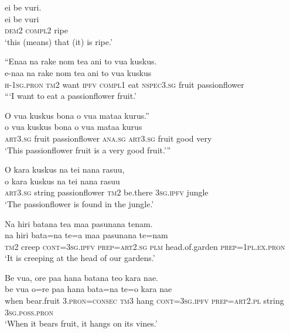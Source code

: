 \ea\label{ex:text7-36}
ei be vuri.\\
\gll ei	be	vuri\\
     \textsc{dem}2	\textsc{compl}2	ripe\\
\glt `this (means) that (it) is ripe.'
\z

\ea\label{ex:text7-37}
``Enaa na rake nom tea ani to vua kuskus.\\
\gll e-naa	na	rake	nom	tea	ani	to	vua	kuskus\\
     \textsc{h}-1\textsc{sg}.\textsc{pron}	\textsc{tm}2	want	\textsc{ipfv}	\textsc{compl}1	eat	\textsc{nspec}3.\textsc{sg}	fruit	passionflower\\
\glt ```I want to eat a passionflower fruit.'
\z

\ea\label{ex:text7-38}
O vua kuskus bona o vua mataa kurus.''\\
\gll o	vua	kuskus	bona	o	vua	mataa	kurus\\
     \textsc{art}3.\textsc{sg}	fruit	passionflower	\textsc{ana}.\textsc{sg}	\textsc{art}3.\textsc{sg}	fruit	good	very\\
\glt `This passionflower fruit is a very good fruit.'''
\z

\ea\label{ex:text7-39}
O kara kuskus na tei nana rasuu,\\
\gll o	kara	kuskus	na	tei	nana	rasuu\\
     \textsc{art}3.\textsc{sg}	string	passionflower	\textsc{tm}2	be.there	3\textsc{sg}.\textsc{ipfv}	jungle\\
\glt `The passionflower is found in the jungle.'
\z

\ea\label{ex:text7-40}
Na hiri batana tea maa pasunana tenam.\\
\gll na	hiri	bata=na	te=a	maa	pasunana	te=nam\\
     \textsc{tm}2	creep	\textsc{cont}=3\textsc{sg}.\textsc{ipfv}	\textsc{prep}=\textsc{art}2.\textsc{sg}	\textsc{plm}	head.of.garden	\textsc{prep}=1\textsc{pl}.\textsc{ex}.\textsc{pron}\\
\glt `It is creeping at the head of our gardens.'
\z

\ea\label{ex:text7-41}
Be vua, ore paa hana batana teo kara nae.\\
\gll be	vua	o=re	paa	hana	bata=na	te=o	kara	nae\\
     when	bear.fruit	3.\textsc{pron}=\textsc{consec}	\textsc{tm}3	hang	\textsc{cont}=3\textsc{sg}.\textsc{ipfv}	\textsc{prep}=\textsc{art}2.\textsc{pl}	string	3\textsc{sg}.\textsc{poss}.\textsc{pron}\\
\glt `When it bears fruit, it hangs on its vines.'
\z

